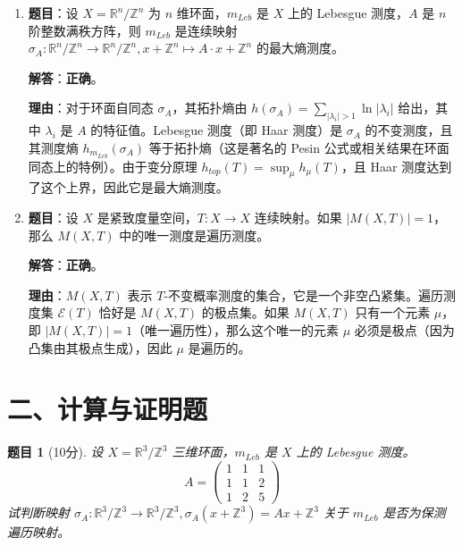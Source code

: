 \documentclass[a4paper,12pt]{article}
\newtheorem{problem}{题目}
\begin{document}
\begin{enumerate}
    \textbf{结论}：基于标准测度论结果，连分数部分 $a_k$ 的期望无穷大，算术平均发散。故判断为\textbf{错误}。（注：若题目指几何平均则为真，但符号为算术平均）。

    \item \textbf{题目}：设 $X = \mathbb{R}^n/\mathbb{Z}^n$ 为 $n$ 维环面，$m_{Leb}$ 是 $X$ 上的 Lebesgue 测度，$A$ 是 $n$ 阶整数满秩方阵，则 $m_{Leb}$ 是连续映射 $\sigma_A: \mathbb{R}^n/\mathbb{Z}^n \to \mathbb{R}^n/\mathbb{Z}^n, x+\mathbb{Z}^n \mapsto A\cdot x + \mathbb{Z}^n$ 的最大熵测度。
    
    \textbf{解答}：\textbf{正确}。
    
    \textbf{理由}：对于环面自同态 $\sigma_A$，其拓扑熵由 $h(\sigma_A) = \sum_{|\lambda_i|>1} \ln |\lambda_i|$ 给出，其中 $\lambda_i$ 是 $A$ 的特征值。Lebesgue 测度（即 Haar 测度）是 $\sigma_A$ 的不变测度，且其测度熵 $h_{m_{Leb}}(\sigma_A)$ 等于拓扑熵（这是著名的 Pesin 公式或相关结果在环面同态上的特例）。由于变分原理 $h_{top}(T) = \sup_\mu h_\mu(T)$，且 Haar 测度达到了这个上界，因此它是最大熵测度。

    \item \textbf{题目}：设 $X$ 是紧致度量空间，$T: X \to X$ 连续映射。如果 $|M(X, T)| = 1$，那么 $M(X, T)$ 中的唯一测度是遍历测度。
    
    \textbf{解答}：\textbf{正确}。
    
    \textbf{理由}：$M(X, T)$ 表示 $T$-不变概率测度的集合，它是一个非空凸紧集。遍历测度集 $\mathcal{E}(T)$ 恰好是 $M(X, T)$ 的极点集。如果 $M(X, T)$ 只有一个元素 $\mu$，即 $|M(X, T)| = 1$（唯一遍历性），那么这个唯一的元素 $\mu$ 必须是极点（因为凸集由其极点生成），因此 $\mu$ 是遍历的。
\end{enumerate}

\section*{二、计算与证明题}

\begin{problem}[10分]
    设 $X = \mathbb{R}^3/\mathbb{Z}^3$ 三维环面，$m_{Leb}$ 是 $X$ 上的 Lebesgue 测度。
    $$
    A = \begin{pmatrix} 1 & 1 & 1 \\ 1 & 1 & 2 \\ 1 & 2 & 5 \end{pmatrix}
    $$
    试判断映射 $\sigma_A: \mathbb{R}^3/\mathbb{Z}^3 \to \mathbb{R}^3/\mathbb{Z}^3, \sigma_A(x+\mathbb{Z}^3) = Ax + \mathbb{Z}^3$ 关于 $m_{Leb}$ 是否为保测遍历映射。
\end{problem}
\end{document}
